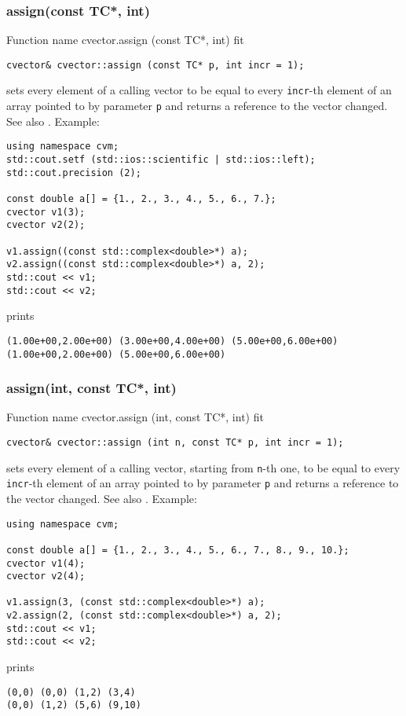 \subsubsection{assign(const TC*, int)}
Function%
\pdfdest name {cvector.assign (const TC*, int)} fit
\begin{verbatim}
cvector& cvector::assign (const TC* p, int incr = 1);
\end{verbatim}
sets every element of a calling vector to be equal to
every \verb"incr"-th element of an array  pointed to by parameter \verb"p"
and returns a reference to the vector changed.
See also .
Example:
\begin{Verbatim}
using namespace cvm;
std::cout.setf (std::ios::scientific | std::ios::left);
std::cout.precision (2);

const double a[] = {1., 2., 3., 4., 5., 6., 7.};
cvector v1(3);
cvector v2(2);

v1.assign((const std::complex<double>*) a);
v2.assign((const std::complex<double>*) a, 2);
std::cout << v1;
std::cout << v2;
\end{Verbatim}
prints
\begin{Verbatim}
(1.00e+00,2.00e+00) (3.00e+00,4.00e+00) (5.00e+00,6.00e+00)
(1.00e+00,2.00e+00) (5.00e+00,6.00e+00)
\end{Verbatim}
\newpage




\subsubsection{assign(int, const TC*, int)}
Function%
\pdfdest name {cvector.assign (int, const TC*, int)} fit
\begin{verbatim}
cvector& cvector::assign (int n, const TC* p, int incr = 1);
\end{verbatim}
sets every element of a calling vector, starting from \Based \verb"n"-th one,
to be equal to
every \verb"incr"-th element of an array  pointed to by parameter \verb"p"
and returns a reference to the vector changed.
See also .
Example:
\begin{Verbatim}
using namespace cvm;

const double a[] = {1., 2., 3., 4., 5., 6., 7., 8., 9., 10.};
cvector v1(4);
cvector v2(4);

v1.assign(3, (const std::complex<double>*) a);
v2.assign(2, (const std::complex<double>*) a, 2);
std::cout << v1;
std::cout << v2;
\end{Verbatim}
prints
\begin{Verbatim}
(0,0) (0,0) (1,2) (3,4)
(0,0) (1,2) (5,6) (9,10)
\end{Verbatim}
\newpage



